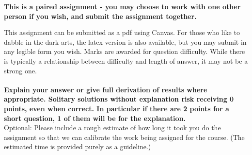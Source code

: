 \documentclass[9pt, addpoints]{exam}
\begin{document}
\begin{center}
    \begin{minipage}{40em}
        \vspace{6pt}
        \begin{center}
            \textbf{This is a paired assignment - you may choose to work with one other
            person if you wish, and submit the assignment together.}
        \end{center}
        \vspace{6pt}

        This assignment can be submitted as a pdf using 
        Canvas.  For those who like to dabble in the dark arts, the latex version 
        is also available, but you may submit in any legible form you wish.
        Marks are awarded for question difficulty. While there is 
        typically a relationship between difficulty and length of answer,
        it may not be a strong one. 
        \\
        \\
        \textbf{Explain your answer or give full derivation
        of results where appropriate. Solitary solutions without explanation
        risk receiving 0 points, even when correct. In particular if there are
        2 points for a short question, 1 of them will be for the explanation.}
        \vspace{12pt}
        \\
        Optional: Please include a rough estimate of how long it took you do the 
        assignment so that we can calibrate the work being assigned for the 
        course. (The estimated time is provided purely as a guideline.)
        \par
        \vspace{12pt}
    \end{minipage}
\end{center}
\vspace{4cm}

\begin{center}
    \gradetable[h]
\end{center}
\newpage
\end{document}
